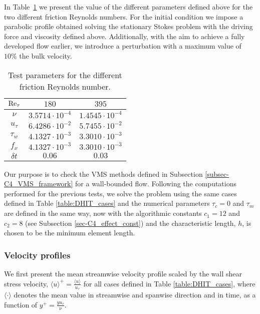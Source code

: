 In Table~\ref{table:Channel_parameters} we present the value of the different parameters defined above for the two different friction Reynolds numbers. For the initial condition we impose a parabolic profile obtained solving the stationary Stokes problem with the driving force and viscosity defined above. Additionally, with the aim to achieve a fully developed flow earlier, we introduce a perturbation with a maximum value of $10\%$ the bulk velocity.

\begin{table}[h!]
\centering
\begin{tabular}{ccc}
\hline
${\rm Re}_\tau$&$180$&$395$\\
\hline
$\nu$&$3.5714\cdot10^{-4}$&$1.4545\cdot10^{-4}$\\
$u_\tau$&$6.4286\cdot10^{-2}$&$5.7455\cdot10^{-2}$\\
$\tau_w$&$4.1327\cdot10^{-3}$&$3.3010\cdot10^{-3}$\\
$f_x$&$4.1327\cdot10^{-3}$&$3.3010\cdot10^{-3}$\\
$\delta t$&$0.06$&$0.03$\\
\hline
\end{tabular}
\caption{Test parameters for the different friction Reynolds number.}
\label{table:Channel_parameters}
\end{table}

Our purpose is to check the VMS methods defined in Subsection \ref{subsec-C4_VMS_framework} for a wall-bounded flow. Following the computations performed for the previous tests, we solve the problem using the same cases defined in Table \ref{table:DHIT_cases} and the numerical parameters $\tau_c=0$ and $\tau_m$ are defined in the same way, now with the algorithmic constants  $c_1=12$ and $c_2=8$ (see Subsection \ref{sec-C4_effect_const}) and the characteristic length, $h$, is chosen to be the minimum element length. 

\subsubsection{Velocity profiles}
We first present the mean streamwise velocity profile scaled by the wall shear stress velocity, $\langle u\rangle^+=\frac{\langle u\rangle}{u_\tau}$ for all cases defined in Table \ref{table:DHIT_cases}, where $\langle\cdot\rangle$  denotes the mean value in streamwise and spanwise direction and in time, as a function of $y^+ = \frac{y u_\tau}{\nu}$.

